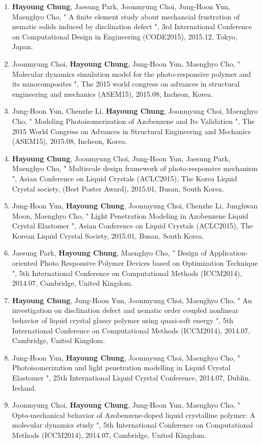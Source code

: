 \documentclass[margin, 10pt]{res} %
\begin{document}
\begin{resume}
\begin{enumerate}
    \item \textbf{Hayoung Chung}, Jaesung Park, Joonmyung Choi, Jung-Hoon Yun, Maenghyo Cho, " A finite element study about mechancial frustration of nematic solids induced by disclination defect ", 3rd International Conference on Computational Design in Engineering (CODE2015), 2015.12, Tokyo, Japan.
    \item Joonmyung Choi, \textbf{Hayoung Chung}, Jung-Hoon Yun, Maenghyo Cho, " Molecular dynamics simulation model for the photo-responsive polymer and its nanocomposites ", The 2015 world congress on advances in structural engineering and mechanics (ASEM15), 2015.08, Incheon, Korea.
    \item Jung-Hoon Yun, Chenzhe Li, \textbf{Hayoung Chung}, Joonmyung Choi, Maenghyo Cho, " Modeling Photoisomerization of Azobenzene and Its Validation ", The 2015 World Congress on Advances in Structural Engineering and Mechanics (ASEM15), 2015.08, Incheon, Korea.
    \item \textbf{Hayoung Chung}, Joonmyung Choi, Jung-Hoon Yun, Jaesung Park, Maenghyo Cho, " Multiscale design framework of photo-responsive mechanism ", Asian Conference on Liquid Crystals (ACLC2015), The Korea Liquid Crystal society, (Best Poster Award), 2015.01, Busan, South Korea.
    \item Jung-Hoon Yun, \textbf{Hayoung Chung}, Joonmyung Choi, Chenzhe Li, Junghwan Moon, Maenghyo Cho, " Light Penetration Modeling in Azobenzene Liquid Crystal Elastomer ", Asian Conference on Liquid Crystals (ACLC2015), The Korean Liquid Crystal Society, 2015.01, Busan, South Korea.
    \item Jaesung Park, \textbf{Hayoung Chung}, Maenghyo Cho, " Design of Application-oriented Photo Responsive Polymer Devices based on Optimization Technique ", 5th International Conference on Computational Methods (ICCM2014), 2014.07, Cambridge, United Kingdom.
    \item \textbf{Hayoung Chung}, Jung-Hoon Yun, Joonmyung Choi, Maenghyo Cho, " An investigation on disclination defect and nematic order coupled nonlinear behavior of liquid crystal glassy polymer using quasi-soft energy ", 5th International Conference on Computational Methods (ICCM2014), 2014.07, Cambridge, United Kingdom.
    \item Jung-Hoon Yun, \textbf{Hayoung Chung}, Joonmyung Choi, Maenghyo Cho, " Photoisomerization and light penetration modelling in Liquid Crystal Elastomer ", 25th International Liquid Crystal Conference, 2014.07, Dublin, Ireland.
    \item Joonmyung Choi, \textbf{Hayoung Chung}, Jung-Hoon Yun, Maenghyo Cho, " Opto-mechanical behavior of Azobenzene-doped liquid crystalline polymer: A molecular dynamics study ", 5th International Conference on Computational Methods (ICCM2014), 2014.07, Cambridge, United Kingdom.

\end{enumerate}
\end{resume}
\end{document}
